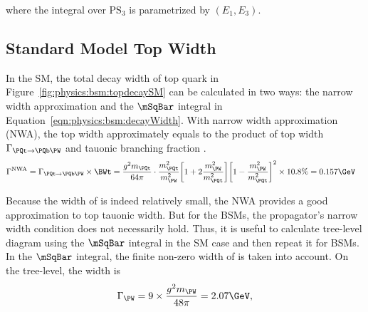 \noindent where the integral over $\mathrm{PS_3}$ is parametrized by $ ( E_1,E_3 )$.



\subsection{Standard Model Top Width}
\label{sec:physics:bsm:smTopDecay}

In the SM, the total decay width of top quark in Figure~\ref{fig:physics:bsm:topdecaySM} can be calculated in two ways: the narrow width approximation and the $\mSqBar $ integral in Equation~\ref{eqn:physics:bsm:decayWidth}. With narrow width approximation (NWA), the top width approximately equals to the product of top width $\Gamma_{\PQt \to \PQb \PW}$ and \PW tauonic branching fraction \BWt.
\begin{equation}
\begin{split}
    \Gamma^{\rm NWA} &= \Gamma_{\PQt \to \PQb \PW} \times \BWt = \frac{g^2 m_\PQt }{64\pi} \cdot \frac{m_\PQt^2}{m_\PW^2} \bigg[ 1+2 \frac{m_\PW^2}{m_\PQt^2}\bigg] \bigg[1-\frac{m_\PW^2}{m_\PQt^2} \bigg]^2 \times 10.8\%  = 0.157 \GeV
\end{split}
\label{eqn:physics:bsm:nwa}
\end{equation}

\noindent Because the width of \PW is indeed relatively small, the NWA provides a good approximation to top tauonic width. But for the BSMs, the propagator's narrow width condition does not necessarily hold. Thus, it is useful to calculate tree-level diagram using the $\mSqBar $ integral in the SM case and then repeat it for BSMs. In the $\mSqBar $ integral, the finite non-zero width of \PW is taken into account. On the tree-level, the \PW width is
\begin{equation}
	\Gamma_{\PW} = 9 \times \frac{g^2 m_\PW}{48 \pi} = 2.07 \GeV,
    \label{eqn:physics:bsm:wWidth}
\end{equation}

